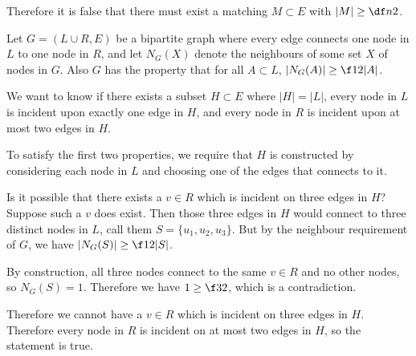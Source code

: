 \documentclass[a4paper]{article}
\begin{document}
Therefore it is false that there must exist a matching $M \subset E$ with $|M| \ge \df n2$.






Let $G = (L \cup R, E)$ be a bipartite graph where every edge connects one node in $L$ to one node in $R$, and let $N_G(X)$ denote the neighbours of some set $X$ of nodes in $G$. Also $G$ has the property that for all $A \subset L$, $|N_G(A)| \ge \f12 |A|$.

We want to know if there exists a subset $H \subset E$ where $|H| = |L|$, every node in $L$ is incident upon exactly one edge in $H$, and every node in $R$ is incident upon at most two edges in $H$.

To satisfy the first two properties, we require that $H$ is constructed by considering each node in $L$ and choosing one of the edges that connects to it.

Is it possible that there exists a $v \in R$ which is incident on three edges in $H$? Suppose such a $v$ does exist. Then those three edges in $H$ would connect to three distinct nodes in $L$, call them $S = \{u_1, u_2, u_3\}$. But by the neighbour requirement of $G$, we have $|N_G(S)| \ge \f12 |S|$.

By construction, all three nodes connect to the same $v \in R$ and no other nodes, so $N_G(S) = 1$. Therefore we have $1 \ge \f32$, which is a contradiction.

Therefore we cannot have a $v \in R$ which is incident on three edges in $H$. Therefore every node in $R$ is incident on at most two edges in $H$, so the statement is true.

\end{document}
